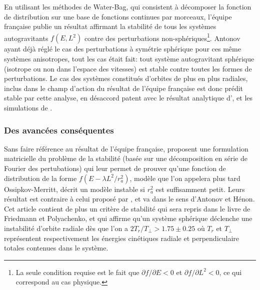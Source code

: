 En utilisant les méthodes de Water-Bag, qui consistent à décomposer la fonction de distribution sur une base de fonctions continues par morceaux,
l'équipe française \cite{waterbag} publie un résultat affirmant la stabilité de tous les systèmes autogravitants $f\left(  E,L^{2}\right)  $ contre
des perturbations non-sphériques\footnote{La seule condition requise est le fait que $\partial f/\partial E<0$ et $\partial f/\partial L^{2}<0$, ce
qui correspond au cas physique.}. Antonov ayant déjà réglé le cas des perturbations à symétrie sphérique pour ces même systèmes anisotropes, tout les
cas était fait: tout système autogravitant sphérique (isotrope ou non dans l'espace des vitesses) est stable contre toutes les formes de
perturbations. Le cas des systèmes constitués d'orbites de plus en plus radiales, inclus dans le champ d'action du résultat de l'équipe française est
donc prédit stable par cette analyse, en désaccord patent avec le résultat analytique d'\cite{antonov}, et les simulations de \cite{henon}.

\subsubsection{Des avancées conséquentes\label{roiadvances}}

Sans faire référence au résultat de l'équipe française, \citet{polyach} proposent une formulation matricielle du problème de
la stabilité (basée sur une décomposition en série de Fourier des pertubations) qui leur permet de prouver qu'une fonction de distribution de la forme
$f\left(  E-\lambda L^{2}/r_{a}^{2}\right)$, modèle que l'on appelera plus tard Ossipkov-Merritt, décrit un modèle instable si $r_{a}^{2}$ est
suffisamment petit. Leurs résultat est contraire à celui proposé par \cite{waterbag}, et va dans
le sens d'Antonov et Hénon. Cet article contient de plus un critère de stabilité qui sera repris dans le livre de Friedmann et Polyachenko, et qui
affirme qu'un système sphérique déclenche une instabilité d'orbite radiale dès que l'on a $2T_{r}/T_{\perp}>1.75\pm0.25$ o\`{u} $T_{r}$ et
$T_{\perp}$ représentent respectivement les énergies cinétiques radiale et perpendiculaire totales contenues dans le système.

